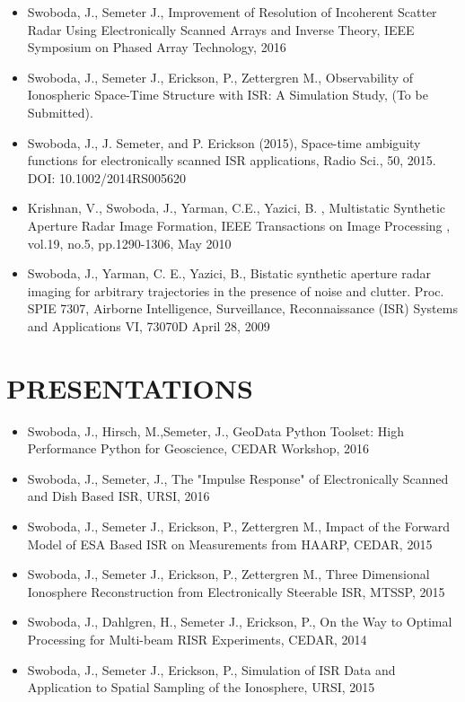 \begin{itemize}
	\item Swoboda, J., Semeter J., Improvement of Resolution of Incoherent Scatter Radar Using Electronically Scanned Arrays and Inverse Theory, IEEE Symposium on Phased Array Technology, 2016
	\item Swoboda, J., Semeter J., Erickson, P., Zettergren M., Observability of Ionospheric Space-Time Structure with ISR:   A Simulation Study, (To be Submitted). 
	\item Swoboda, J., J. Semeter, and P. Erickson (2015), Space-time ambiguity functions for electronically scanned ISR applications, Radio Sci., 50, 2015. DOI: 10.1002/2014RS005620

	\item Krishnan, V., Swoboda, J., Yarman, C.E., Yazici, B. , Multistatic Synthetic Aperture Radar Image Formation, IEEE Transactions on Image Processing , vol.19, no.5, pp.1290-1306, May 2010
    \item  Swoboda, J., Yarman, C. E., Yazici, B., Bistatic synthetic aperture radar imaging for arbitrary trajectories in the presence of noise and clutter. Proc. SPIE 7307, Airborne Intelligence, Surveillance, Reconnaissance (ISR) Systems and Applications VI, 73070D April 28, 2009 
\end{itemize}
	
\section*{PRESENTATIONS}
\begin{itemize}
	\item Swoboda, J., Hirsch, M.,Semeter, J., GeoData Python Toolset: High Performance Python for Geoscience, CEDAR Workshop, 2016
    \item Swoboda, J.,  Semeter, J., The "Impulse Response" of Electronically Scanned and Dish Based ISR, URSI, 2016
    \item Swoboda, J., Semeter J., Erickson, P., Zettergren M., Impact of the Forward Model of ESA Based ISR on Measurements from HAARP, CEDAR, 2015
	\item Swoboda, J., Semeter J., Erickson, P., Zettergren M., Three Dimensional Ionosphere Reconstruction from Electronically Steerable ISR, MTSSP, 2015
	\item Swoboda, J., Dahlgren, H., Semeter J., Erickson, P., On the Way to Optimal Processing for Multi-beam RISR Experiments, CEDAR, 2014
    \item Swoboda, J., Semeter J., Erickson, P., Simulation of ISR Data and Application to Spatial Sampling of the Ionosphere, URSI, 2015
\end{itemize}


